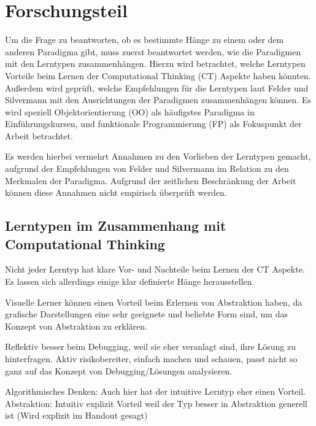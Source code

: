 \clearpage
\section{Forschungsteil}
\label{sec:work}


Um die Frage zu beantworten, ob es bestimmte Hänge zu einem oder dem anderen Paradigma gibt, muss zuerst beantwortet werden, wie die Paradigmen mit den Lerntypen zusammenhängen.
Hierzu wird betrachtet, welche Lerntypen Vorteile beim Lernen der Computational Thinking (CT) Aspekte haben könnten.
Außerdem wird geprüft, welche Empfehlungen für die Lerntypen laut Felder und Silvermann mit den Ausrichtungen der Paradigmen zusammenhängen können. Es wird speziell Objektorientierung (OO) als häufigstes Paradigma in Einführungskursen, und funktionale Programmierung (FP) als Fokuspunkt der Arbeit betrachtet.

Es werden hierbei vermehrt Annahmen zu den Vorlieben der Lerntypen gemacht, aufgrund der Empfehlungen von Felder und Silvermann im Relation zu den Merkmalen der Paradigma. Aufgrund der zeitlichen Beschränkung der Arbeit können diese Annahmen nicht empirisch überprüft werden.

\subsection{Lerntypen im Zusammenhang mit Computational Thinking}

Nicht jeder Lerntyp hat klare Vor- und Nachteile beim Lernen der CT Aspekte. Es lassen sich allerdings einige klar definierte Hänge herausstellen.

Visuelle Lerner können einen Vorteil beim Erlernen von Abstraktion haben, da grafische Darstellungen eine sehr geeignete und beliebte Form sind, um das Konzept von Abstraktion zu erklären. %

Reflektiv besser beim Debugging, weil sie eher veranlagt sind, ihre Lösung zu hinterfragen.
Aktiv risikobereiter, einfach machen und schauen, passt nicht so ganz auf das Konzept von Debugging/Lösungen analysieren.

Algorithmisches Denken: Auch hier hat der intuitive Lerntyp eher einen Vorteil. %
Abstraktion: Intuitiv explizit Vorteil weil der Typ besser in Abstraktion generell ist (Wird explizit im Handout gesagt)

